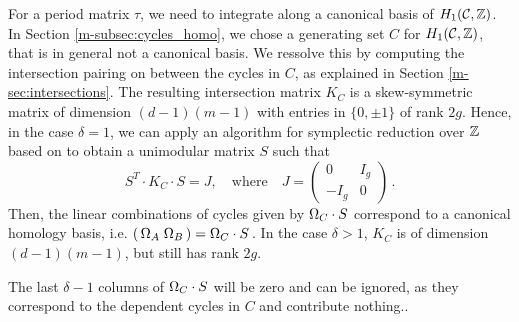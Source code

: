 \documentclass[main.tex]{subfiles}
\begin{document}
  For a period matrix $\tau$, we need to integrate along a canonical basis of $H_1(\mathcal{C},\mathbb{Z})$. In Section \ref{m-subsec:cycles_homo}, we chose a generating set $C$ for $H_1(\mathcal{C},\mathbb{Z})$, that is in general not 
  a canonical basis. \abstand We 
  ressolve this by computing the intersection pairing on between the cycles in $C$, as explained in Section \ref{m-sec:intersections}. The resulting intersection matrix $K_C$
   is a skew-symmetric matrix of dimension $(d-1)(m-1)$ with entries in $\{ 0,\pm 1\}$ of rank $2g$. Hence, in the case $\delta = 1$, we can apply an algorithm 
  for symplectic reduction over $\mathbb{Z}$ based on
    \cite[Theorem 18]{KB2002} to obtain a unimodular matrix $S$ such that
  $$S^T \cdot K_C \cdot S = J, \quad \text{where} \quad J = \begin{pmatrix} 0 & I_g \\ -I_g & 0 \end{pmatrix}\,.$$
  Then, the linear combinations of cycles given by $\Omega_C \cdot S$ correspond to a canonical homology basis, i.e. $( \, \Omega_A \; \Omega_B \, ) = \Omega_C \cdot S$\,.
  In the case $\delta > 1$, $K_C$ is of dimension $(d-1)(m-1)$, but still has rank $2g$. 
  
  The last $\delta-1$ columns of $\Omega_C \cdot S$ will be zero and can be ignored, as they correspond to the dependent cycles
  in $C$ and contribute nothing..
  
 
\biblio
\end{document}
